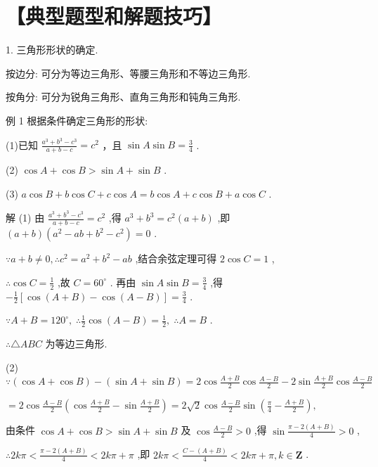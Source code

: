 \documentclass[10pt]{article}
\begin{document}
\section*{【典型题型和解题技巧】}

1. 三角形形状的确定.

按边分: 可分为等边三角形、等腰三角形和不等边三角形.

按角分: 可分为锐角三角形、直角三角形和钝角三角形.

例 1 根据条件确定三角形的形状:

(1)已知 \(\frac{{a}^{3} + {b}^{3} - {c}^{3}}{a + b - c} = {c}^{2}\) ，且 \(\sin A\sin B = \frac{3}{4}\) .

(2) \(\cos A + \cos B > \sin A + \sin B\) .

(3) \(a\cos B + b\cos C + c\cos A = b\cos A + c\cos B + a\cos C\) .

解 (1) 由 \(\frac{{a}^{3} + {b}^{3} - {c}^{3}}{a + b - c} = {c}^{2}\) ,得 \({a}^{3} + {b}^{3} = {c}^{2}\left( {a + b}\right)\) ,即 \(\left( {a + b}\right) \left( {{a}^{2} - {ab} + {b}^{2} - {c}^{2}}\right)  = 0\) .

\(\because a + b \neq  0,\therefore {c}^{2} = {a}^{2} + {b}^{2} - {ab}\) ,结合余弦定理可得 \(2\cos C = 1\) ,

\(\therefore \cos C = \frac{1}{2}\) ,故 \(C = {60}^{ \circ  }\) . 再由 \(\sin A\sin B = \frac{3}{4}\) ,得 \(- \frac{1}{2}\left\lbrack  {\cos \left( {A + B}\right)  - \cos \left( {A - B}\right) }\right\rbrack   = \frac{3}{4}\) .

\(\because A + B = {120}^{ \circ  },\;\therefore \frac{1}{2}\cos \left( {A - B}\right)  = \frac{1}{2},\;\therefore A = B\) .

\(\therefore \bigtriangleup {ABC}\) 为等边三角形.

(2) \(\because \left( {\cos A + \cos B}\right)  - \left( {\sin A + \sin B}\right)  = 2\cos \frac{A + B}{2}\cos \frac{A - B}{2} - 2\sin \frac{A + B}{2}\cos \frac{A - B}{2}\)

\(= 2\cos \frac{A - B}{2}\left( {\cos \frac{A + B}{2} - \sin \frac{A + B}{2}}\right)  = 2\sqrt{2}\cos \frac{A - B}{2}\sin \left( {\frac{\pi }{4} - \frac{A + B}{2}}\right) ,\)

由条件 \(\cos A + \cos B > \sin A + \sin B\) 及 \(\cos \frac{A - B}{2} > 0\) ,得 \(\sin \frac{\pi  - 2\left( {A + B}\right) }{4} > 0\) ,

\(\therefore {2k\pi } < \frac{\pi  - 2\left( {A + B}\right) }{4} < {2k\pi } + \pi\) ,即 \({2k\pi } < \frac{C - \left( {A + B}\right) }{4} < {2k\pi } + \pi ,k \in  \mathbf{Z}\) .
\end{document}
